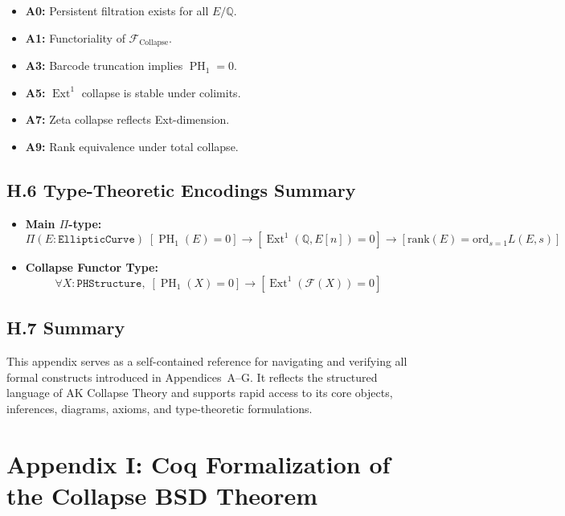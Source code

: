 \documentclass[11pt]{article}
\DeclareMathOperator{\Ext}{Ext}
\DeclareMathOperator{\PH}{PH}
\newcommand{\QQ}{\mathbb{Q}}
\begin{document}
\begin{itemize}
  \item \textbf{A0:} Persistent filtration exists for all $E/\QQ$.
  \item \textbf{A1:} Functoriality of $\mathcal{F}_{\mathrm{Collapse}}$.
  \item \textbf{A3:} Barcode truncation implies $\PH_1 = 0$.
  \item \textbf{A5:} $\Ext^1$ collapse is stable under colimits.
  \item \textbf{A7:} Zeta collapse reflects Ext-dimension.
  \item \textbf{A9:} Rank equivalence under total collapse.
\end{itemize}

\subsection*{H.6 Type-Theoretic Encodings Summary}

\begin{itemize}
  \item \textbf{Main $\Pi$-type:}
  \[
  \Pi (E : \texttt{EllipticCurve})\; 
  [\PH_1(E) = 0] \to [\Ext^1(\QQ,E[n]) = 0] \to [\mathrm{rank}(E) = \mathrm{ord}_{s=1} L(E,s)]
  \]
  \item \textbf{Collapse Functor Type:}
  \[
  \forall X : \texttt{PHStructure},\; [\PH_1(X) = 0] \to [\Ext^1(\mathcal{F}(X)) = 0]
  \]
\end{itemize}

\subsection*{H.7 Summary}

This appendix serves as a self-contained reference for navigating and verifying all formal constructs introduced in Appendices~A--G.  
It reflects the structured language of AK Collapse Theory and supports rapid access to its core objects, inferences, diagrams, axioms, and type-theoretic formulations.




\section*{Appendix I: Coq Formalization of the Collapse BSD Theorem}
\end{document}
